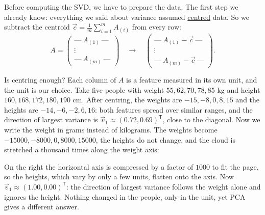\documentclass[a4paper,12pt,oneside]{report}
\begin{document}
Before computing the SVD, we have to prepare the data. The first step
we already know: everything we said about variance assumed
\hyperref[sec:centring]{centred} data. So we subtract the centroid
$\vec c=\frac1m\sum_{i=1}^{m}A_{(i)}$ from every row:
\[
  A=\begin{pmatrix}
    \text{---}\ A_{(1)}\ \text{---}\\ \vdots\\ \text{---}\ A_{(m)}\ \text{---}
  \end{pmatrix}
  \quad\longrightarrow\quad
  \begin{pmatrix}
    \text{---}\ A_{(1)}-\vec c\ \text{---}\\ \vdots\\
    \text{---}\ A_{(m)}-\vec c\ \text{---}
  \end{pmatrix}.
\]

Is centring enough? Each column of $A$ is a feature measured in its
own unit, and the unit is our choice. Take five people with weight
$55,62,70,78,85$ kg and height $160,168,172,180,190$ cm. After
centring, the weights are $-15,-8,0,8,15$ and the heights are
$-14,-6,-2,6,16$: both features spread over similar ranges, and the
direction of largest variance is
$\vec v_1\approx(0.72,0.69)^{\mathsf T}$, close to the diagonal. Now
we write the weight in grams instead of kilograms. The weights become
$-15000,-8000,0,8000,15000$, the heights do not change, and the cloud
is stretched a thousand times along the weight axis:
\begin{center}
\end{center}
On the right the horizontal axis is compressed by a factor of $1000$
to fit the page, so the heights, which vary by only a few units,
flatten onto the axis. Now
$\vec v_1\approx(1.00,0.00)^{\mathsf T}$: the direction of largest
variance follows the weight alone and ignores the height. Nothing
changed in the people, only in the unit, yet PCA gives a different
answer.
\end{document}
